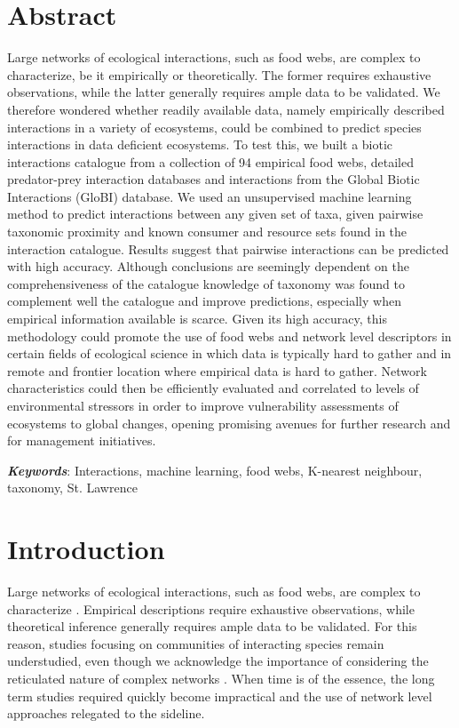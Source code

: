 \section{Abstract}
Large networks of ecological interactions, such as food webs, are complex to characterize, be it empirically or theoretically. The former requires exhaustive observations, while the latter generally requires ample data to be validated. We therefore wondered whether readily available data, namely empirically described interactions in a variety of ecosystems, could be combined to predict species interactions in data deficient ecosystems. To test this, we built a biotic interactions catalogue from a collection of 94 empirical food webs, detailed predator-prey interaction databases and interactions from the Global Biotic Interactions (GloBI) database. We used an unsupervised machine learning method to predict interactions between any given set of taxa, given pairwise taxonomic proximity and known consumer and resource sets found in the interaction catalogue. Results suggest that pairwise interactions can be predicted with high accuracy. Although conclusions are seemingly dependent on the comprehensiveness of the catalogue knowledge of taxonomy was found to complement well the catalogue and improve predictions, especially when empirical information available is scarce. Given its high accuracy, this methodology could promote the use of food webs and network level descriptors in certain fields of ecological science in which data is typically hard to gather and in remote and frontier location where empirical data is hard to gather. Network characteristics could then be efficiently evaluated and correlated to levels of environmental stressors in order to improve vulnerability assessments of ecosystems to global changes, opening promising avenues for further research and for management initiatives. \linebreak[2]

\textbf{\textit{Keywords}}: Interactions, machine learning, food webs, K-nearest neighbour, taxonomy, St. Lawrence

\section{Introduction}
Large networks of ecological interactions, such as food webs, are complex to characterize \citep{polis1991, martinez1992, pascual2006}. Empirical descriptions require exhaustive observations, while theoretical inference generally requires ample data to be validated. For this reason, studies focusing on communities of interacting species remain understudied, even though we acknowledge the importance of considering the reticulated nature of complex networks \citep{ings2009, tylianakis2008}. When time is of the essence, the long term studies required quickly become impractical and the use of network level approaches relegated to the sideline.


